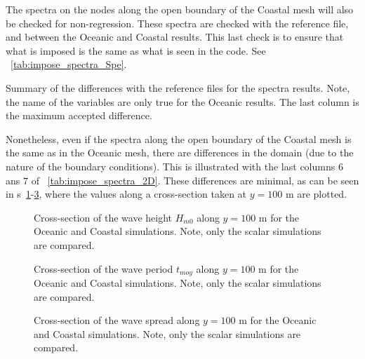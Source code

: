 The spectra on the nodes along the open boundary of the Coastal mesh will also
be checked for non-regression. These spectra are checked with the reference
file, and between the Oceanic and Coastal results. This last check is to ensure
that what is imposed is the same as what is seen in the code.
See \tablename~\ref{tab:impose_spectra_Spe}.

%
\begin{table}[H]
\begin{center}
%
\small
%
\caption{Summary of the differences with the reference files for the spectra
  results. Note, the name of the variables are only true for the Oceanic
  results. The last column is the maximum accepted difference.}
\label{tab:impose_spectra_Spe}
%
%
%
\end{center}
\end{table}
%

Nonetheless, even if the spectra along the open boundary of the Coastal mesh is
the same as in the Oceanic mesh, there are differences in the domain (due to
the nature of the boundary conditions). This is illustrated with the last
columns $6$ ans $7$ of \tablename~\ref{tab:impose_spectra_2D}. These
differences are minimal, as can be seen in
\figurename{}s~\ref{fig:impose_spectra_Hm0}-\ref{fig:impose_spectra_WSpread},
where the values along a cross-section taken at $y=100$ m are plotted.

\begin{figure}[H]
\begin{center}
\end{center}
\caption{Cross-section of the wave height $H_{m0}$ along $y=100$ m for the
  Oceanic and Coastal
simulations. Note, only the scalar simulations are compared.}
\label{fig:impose_spectra_Hm0}
\end{figure}

\vfill\mbox{}

\begin{figure}[H]
\begin{center}
\end{center}
\caption{Cross-section of the wave period $t_{moy}$ along $y=100$ m for the
  Oceanic and Coastal
simulations. Note, only the scalar simulations are compared.}
\label{fig:impose_spectra_Tmoy}
\end{figure}

\begin{figure}[H]
\begin{center}
\end{center}
\caption{Cross-section of the wave spread along $y=100$ m for the Oceanic and
  Coastal simulations.
Note, only the scalar simulations are compared.}
\label{fig:impose_spectra_WSpread}
\end{figure}



